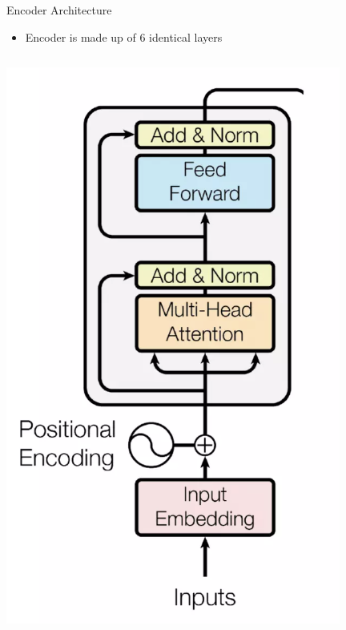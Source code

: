 \documentclass{beamer}
\begin{document}
\begin{frame}{Encoder Architecture}
\begin{itemize}
    \item Encoder is made up of 6 identical layers
\end{itemize}
\begin{columns}

  \includegraphics[width=1\linewidth]{f5.png} %
\begin{itemize}


\end{itemize}
\end{columns}
\end{frame}
\end{document}
